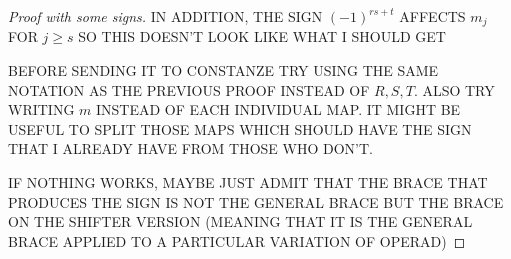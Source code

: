 \documentclass[twoside]{article}
\begin{document}
\begin{proof}[Proof with some signs]
IN ADDITION, THE SIGN $(-1)^{rs+t}$ AFFECTS $m_j$ FOR $j\geq s$ SO THIS DOESN'T LOOK LIKE WHAT I SHOULD GET

BEFORE SENDING IT TO CONSTANZE TRY USING THE SAME NOTATION AS THE PREVIOUS PROOF INSTEAD OF $R,S,T$. ALSO TRY WRITING $m$ INSTEAD OF EACH INDIVIDUAL MAP. IT MIGHT BE USEFUL TO SPLIT THOSE MAPS WHICH SHOULD HAVE THE SIGN THAT I ALREADY HAVE FROM THOSE WHO DON'T.

IF NOTHING WORKS, MAYBE JUST ADMIT THAT THE BRACE THAT PRODUCES THE SIGN IS NOT THE GENERAL BRACE BUT THE BRACE ON THE SHIFTER VERSION (MEANING THAT IT IS THE GENERAL BRACE APPLIED TO A PARTICULAR VARIATION OF OPERAD)
\end{proof}
%
%
%
%
%
%
%
\end{document}
